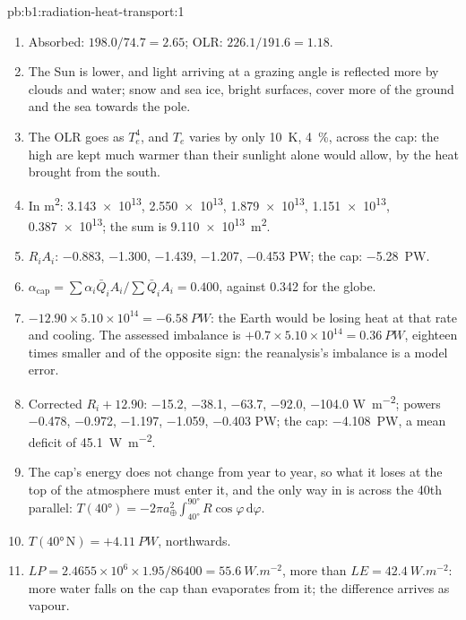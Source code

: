 \begin{solution}{pb:b1:radiation-heat-transport:1}
\begin{enumerate}
        \num{242.9}, \num{241.1} \unit{K}.
  \item Absorbed: $198.0/74.7 = 2.65$; OLR: $226.1/191.6 = 1.18$.
  \item The Sun is lower, and light arriving at a grazing angle is reflected more
        by clouds and water; snow and sea ice, bright surfaces, cover more of the
        ground and the sea towards the pole.
  \item The OLR goes as $T_e^4$, and $T_e$ varies by only \qty{10}{K}, \qty{4}{\percent},
        across the cap: the high  are kept much warmer than their sunlight
        alone would allow, by the heat brought from the south.
  \item In \unit{m^2}: \num{3.143e13}, \num{2.550e13}, \num{1.879e13},
        \num{1.151e13}, \num{0.387e13}; the sum is \qty{9.110e13}{m^2}.
  \item $R_iA_i$: \num{-0.883}, \num{-1.300}, \num{-1.439}, \num{-1.207},
        \num{-0.453} \unit{PW}; the cap: \qty{-5.28}{PW}.
  \item $\alpha_\text{cap} = \sum\alpha_i\bar Q_iA_i/\sum\bar Q_iA_i = 0.400$,
        against \num{0.342} for the globe.
  \item $-12.90 \times 5.10\times10^{14} = \qty{-6.58}{PW}$: the Earth would be
        losing heat at that rate and cooling. The assessed imbalance is
        $+0.7 \times 5.10\times10^{14} = \qty{+0.36}{PW}$, eighteen times smaller and
        of the opposite sign: the reanalysis's imbalance is a model error.
  \item Corrected $R_i + 12.90$: \num{-15.2}, \num{-38.1}, \num{-63.7},
        \num{-92.0}, \num{-104.0} \unit{W.m^{-2}}; powers \num{-0.478},
        \num{-0.972}, \num{-1.197}, \num{-1.059}, \num{-0.403} \unit{PW}; the cap:
        \qty{-4.108}{PW}, a mean deficit of \qty{45.1}{W.m^{-2}}.
  \item The cap's energy does not change from year to year, so what it loses at
        the top of the atmosphere must enter it, and the only way in is across the
        40th parallel: $T(\ang{40}) = -2\pi a_\oplus^2\int_{\ang{40}}^{\ang{90}}
        R\cos\varphi\,\mathrm d\varphi$.
  \item $T(\ang{40}\,\text{N}) = +\qty{4.11}{PW}$, northwards.
  \item $LP = 2.4655\times10^6 \times 1.95/86400 = \qty{55.6}{W.m^{-2}}$, more than
        $LE = \qty{42.4}{W.m^{-2}}$: more water falls on the cap than evaporates
        from it; the difference arrives as vapour.

\end{enumerate}
\end{solution}
